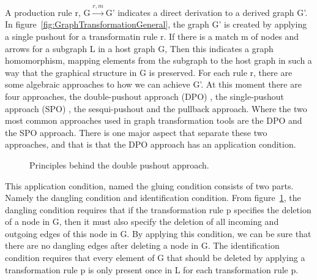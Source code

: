 A production rule r, \mbox{G$\xrightarrow{r,m}$G'} indicates a direct
derivation to a derived graph G'. In
figure~\ref{fig:GraphTransformationGeneral}, the graph G' is created by
applying a single pushout for a transformatin rule r. If there is a match m of
nodes and arrows for a subgraph L in a host graph G, Then this indicates a
graph homomorphism, mapping elements from the subgraph to the host graph in
such a way that the graphical structure in G is preserved. For each rule r,
there are some algebraic approaches to how we can achieve G'. At this moment
there are four approaches, the double-pushout approach (DPO) \cite{Loewe1997}, the
single-pushout approach (SPO) \cite{Ehrig1997}, the
sesqui-pushout\cite{Corradini2006} and the pullback approach\cite{Bauderon}.
Where the two most common approaches used in graph transformation tools are the
DPO and the SPO approach. There is one major aspect that separate these two
approaches, and that is that the DPO approach has an application condition.

\begin{figure}[H]
	\centering
	\caption[The Double Pushout approach]
	{Principles behind the double pushout approach.}
	\label{fig:DPO}
\end{figure}

\noindent This application condition, named the gluing condition\cite{Loewe1997}
consists of two parts. Namely the dangling condition and identification
condition. From figure~\ref{fig:DPO}, the dangling condition requires that if
the transformation rule p specifies the deletion of a node in G, then it must also
specify the deletion of all incoming and outgoing edges of this node in G. By
applying this condition, we can be sure that there are no dangling edges after
deleting a node in G. The identification condition requires that every element
of G that should be deleted by applying a transformation rule p is only present
once in L for each transformation rule p. 

